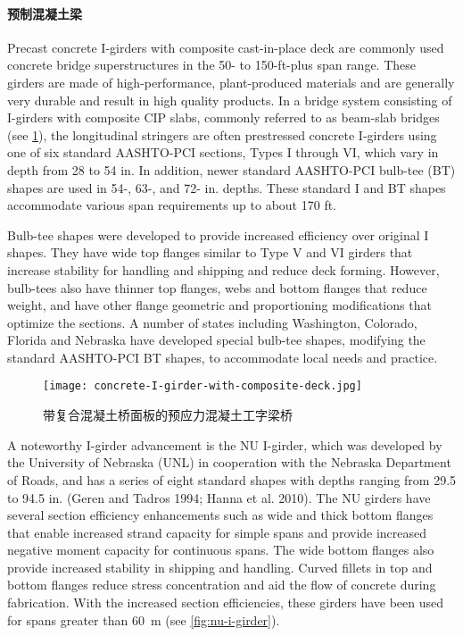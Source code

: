 \paragraph{预制混凝土梁}

Precast concrete I-girders with composite cast-in-place deck are commonly used concrete bridge superstructures in the 50- to 150-ft-plus span range. These girders are made of high-performance, plant-produced materials and are generally very durable and result in high quality products. In a bridge system consisting of I-girders with composite CIP slabs, commonly referred to as beam-slab bridges (see \cref{fig:concrete-I-girder-with-composite-deck}), the longitudinal stringers are often prestressed concrete I-girders using one of six standard AASHTO-PCI sections, Types I through VI, which vary in depth from 28 to 54 in. In addition, newer standard AASHTO-PCI bulb-tee (BT) shapes are used in 54-, 63-, and 72- in. depths. These standard I and BT shapes accommodate various span requirements up to about 170 ft.

Bulb-tee shapes were developed to provide increased efficiency over original I shapes. They have wide top flanges similar to Type V and VI girders that increase stability for handling and shipping and reduce deck forming. However, bulb-tees also have thinner top flanges, webs and bottom flanges that reduce weight, and have other flange geometric and proportioning modifications that optimize the sections. A number of states including Washington, Colorado, Florida and Nebraska have developed special bulb-tee shapes, modifying the standard AASHTO-PCI BT shapes, to accommodate local needs and practice.

\begin{figure}
  \texttt{[image: concrete-I-girder-with-composite-deck.jpg]}
  \caption{带复合混凝土桥面板的预应力混凝土工字梁桥}
  \label{fig:concrete-I-girder-with-composite-deck}
\end{figure}

A noteworthy I-girder advancement is the NU I-girder, which was developed by the University of Nebraska (UNL) in cooperation with the Nebraska Department of Roads, and has a series of eight standard shapes with depths ranging from 29.5 to 94.5 in. (Geren and Tadros 1994; Hanna et al. 2010). The NU girders have several section efficiency enhancements such as wide and thick bottom flanges that enable increased strand capacity for simple spans and provide increased negative moment capacity for continuous spans. The wide bottom flanges also provide increased stability in shipping and handling. Curved fillets in top and bottom flanges reduce stress concentration and aid the flow of concrete during fabrication. With the increased section efficiencies, these girders have been used for spans greater than \qty{60}{m} (see \cref{fig:nu-i-girder}).

